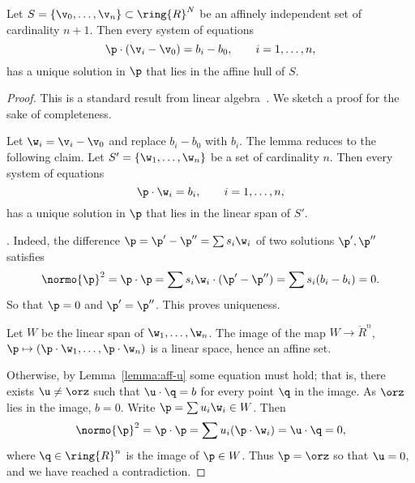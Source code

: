 \begin{lemma}[]\label{lemma:affine-system} 
  Let $S=\{\v_0,\ldots,\v_n\}\subset \ring{R}^N$ be an affinely
  independent set of cardinality $n+1$.  Then every system of
  equations
\begin{displaymath} 
\p \cdot (\v_i - \v_0) = b_i-b_0,\qquad i=1,\ldots,n,
\end{displaymath}
has a unique solution in $\p$ that lies in the affine hull of $S$.
\end{lemma}

\begin{proof} This is a standard result from linear algebra~\cite{XX}.
We sketch a proof for the sake of completeness.  

Let $\w_i = \v_i-\v_0$ and replace $b_i-b_0$ with $b_i$.  
The lemma reduces to the following claim.
Let $S' = \{\w_1,\ldots,\w_n\}$ be a  set
of cardinality $n$.  Then every system of equations
\begin{displaymath} 
\p \cdot \w_i = b_i,\qquad i=1,\ldots,n,
\end{displaymath}
has a unique solution in $\p$ that lies in the linear span of $S'$.

. Indeed, the difference 
$\p = \p'-\p'' = \sum s_i \w_i$ of two solutions
$\p',\p''$ satisfies
\begin{displaymath} 
\normo{\p}^2=\p\cdot\p = \sum s_i \w_i \cdot (\p' - \p'') =
\sum s_i (b_i-b_i)= 0.
\end{displaymath}
So that $\p=0$ and $\p'=\p''$.  This proves uniqueness.

Let $W$ be the linear span of $\w_1,\ldots,\w_n$.  The image of the
map $W\to\ring{R}^n$, $\p\mapsto (\p\cdot\w_1,\ldots,\p\cdot\w_n)$ is
a linear space, hence an affine set.

Otherwise, by Lemma~\ref{lemma:aff-u} some equation must hold; that
is, there exists $\u\ne \orz$ such that $\u\cdot \q =b$ for every
point $\q$ in the image.  As $\orz$ lies in the image, $b=0$.  Write
$\p = \sum u_i \w_i\in W$.  Then
\begin{displaymath} 
\normo{\p}^2 = \p\cdot\p = \sum u_i (\p \cdot \w_i) = \u\cdot \q = 0,
\end{displaymath} 
where $\q\in\ring{R}^n$ is the image of $\p\in W$.
Thus $\p=\orz$ so that $\u=0$, and we have reached a contradiction.
\end{proof}


